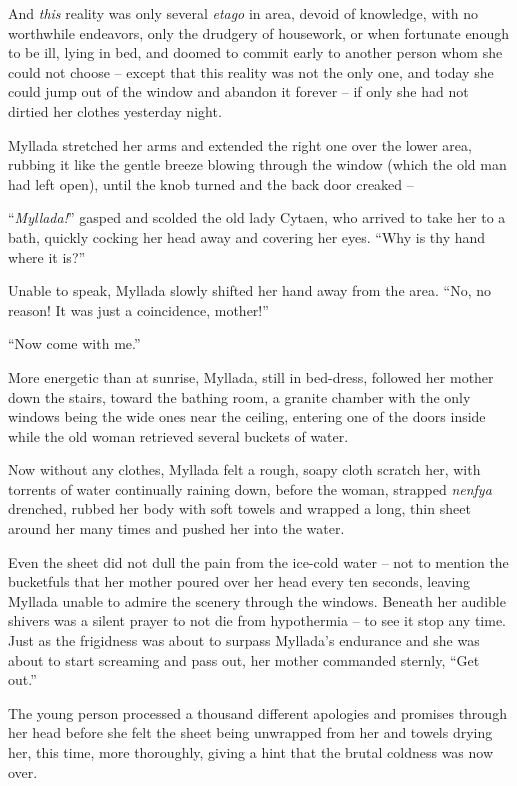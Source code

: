 And \emph{this} reality was only several \emph{etago} in area, devoid of knowledge, with no worthwhile endeavors, only the drudgery of housework, or when fortunate enough to be ill, lying in bed, and doomed to commit early to another person whom she could not choose -- except that this reality was not the only one, and today she could jump out of the window and abandon it forever -- if only she had not dirtied her clothes yesterday night.

Myllada stretched her arms and extended the right one over the lower area, rubbing it like the gentle breeze blowing through the window (which the old man had left open), until the knob turned and the back door creaked --

``\emph{Myllada!}'' gasped and scolded the old lady Cytaen, who arrived to take her to a bath, quickly cocking her head away and covering her eyes. ``Why is thy hand where it is?''

Unable to speak, Myllada slowly shifted her hand away from the area. ``No, no reason! It was just a coincidence, mother!''

``Now come with me.''

More energetic than at sunrise, Myllada, still in bed-dress, followed her mother down the stairs, toward the bathing room, a granite chamber with the only windows being the wide ones near the ceiling, entering one of the doors inside while the old woman retrieved several buckets of water.

Now without any clothes, Myllada felt a rough, soapy cloth scratch her, with torrents of water continually raining down, before the woman, strapped \emph{nenfya} drenched, rubbed her body with soft towels and wrapped a long, thin sheet around her many times and pushed her into the water.

Even the sheet did not dull the pain from the ice-cold water -- not to mention the bucketfuls that her mother poured over her head every ten seconds, leaving Myllada unable to admire the scenery through the windows. Beneath her audible shivers was a silent prayer to not die from hypothermia -- to see it stop any time. Just as the frigidness was about to surpass Myllada's endurance and she was about to start screaming and pass out, her mother commanded sternly, ``Get out.''

The young person processed a thousand different apologies and promises through her head before she felt the sheet being unwrapped from her and towels drying her, this time, more thoroughly, giving a hint that the brutal coldness was now over.

